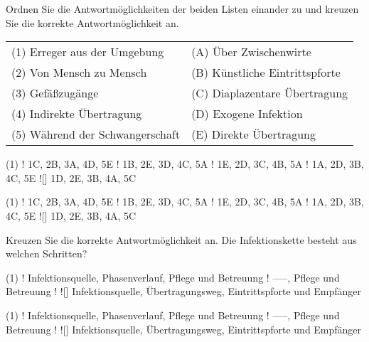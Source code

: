 \documentclass[a4paper]{scrartcl}
\begin{document}
\begin{aufgabe}{2}
	Ordnen Sie die Antwortmöglichkeiten der beiden Listen einander zu und kreuzen Sie die korrekte Antwortmöglichkeit an.
	
	\vspace{1em}
	\begin{tabular}{ll}
		(1) Erreger aus der Umgebung & (A) Über Zwischenwirte\\
		(2) Von Mensch zu Mensch & (B) Künstliche Eintrittspforte\\
		(3) Gefäßzugänge & (C) Diaplazentare Übertragung\\
		(4) Indirekte Übertragung & (D) Exogene Infektion \\
		(5) Während der Schwangerschaft & (E) Direkte Übertragung\\
	\end{tabular}
	
	
	\begin{mcumgebung}(1)
		\choice! 1C, 2B, 3A, 4D, 5E
		\choice! 1B, 2E, 3D, 4C, 5A
		\choice! 1E, 2D, 3C, 4B, 5A
		\choice! 1A, 2D, 3B, 4C, 5E
		\choice![\mcrichtig] 1D, 2E, 3B, 4A, 5C
	\end{mcumgebung}
	
	\begin{loesung}
		\begin{mcumgebung}(1)
		\choice! 1C, 2B, 3A, 4D, 5E
		\choice! 1B, 2E, 3D, 4C, 5A
		\choice! 1E, 2D, 3C, 4B, 5A
		\choice! 1A, 2D, 3B, 4C, 5E
		\choice![\mcrichtig] 1D, 2E, 3B, 4A, 5C
		\end{mcumgebung}
	\end{loesung}
\end{aufgabe}




\begin{aufgabe}{1}
	Kreuzen Sie die korrekte Antwortmöglichkeit an. Die Infektionskette besteht aus welchen Schritten?
	\begin{center}
		\begin{mcumgebung}(1)
			\choice! Infektionsquelle, Phasenverlauf, Pflege und Betreuung
			\choice!  -----, Pflege und Betreuung
			\choice!
			\choice![\mcrichtig] Infektionsquelle, Übertragungsweg, Eintrittspforte und Empfänger
		\end{mcumgebung}
	\end{center}
	
	\begin{loesung}
		\begin{mcumgebung}(1)
			\choice! Infektionsquelle, Phasenverlauf, Pflege und Betreuung
			\choice!  -----, Pflege und Betreuung
			\choice!
			\choice![\mcrichtig] Infektionsquelle, Übertragungsweg, Eintrittspforte und Empfänger
		\end{mcumgebung}
	\end{loesung}
\end{aufgabe}
\end{document}
